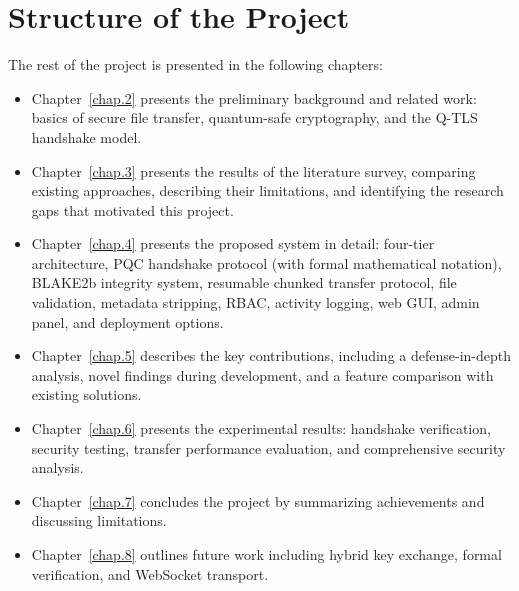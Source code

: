\section{Structure of the Project}

The rest of the project is presented in the following chapters:

\begin{itemize}
    \item Chapter~\ref{chap.2} presents the preliminary background and related work: basics of secure file transfer, quantum-safe cryptography, and the Q-TLS handshake model.
    
    \item Chapter~\ref{chap.3} presents the results of the literature survey, comparing existing approaches, describing their limitations, and identifying the research gaps that motivated this project.
    
    \item Chapter~\ref{chap.4} presents the proposed system in detail: four-tier architecture, PQC handshake protocol (with formal mathematical notation), BLAKE2b integrity system, resumable chunked transfer protocol, file validation, metadata stripping, RBAC, activity logging, web GUI, admin panel, and deployment options.
    
    \item Chapter~\ref{chap.5} describes the key contributions, including a defense-in-depth analysis, novel findings during development, and a feature comparison with existing solutions.
    
    \item Chapter~\ref{chap.6} presents the experimental results: handshake verification, security testing, transfer performance evaluation, and comprehensive security analysis.
    
    \item Chapter~\ref{chap.7} concludes the project by summarizing achievements and discussing limitations.
    
    \item Chapter~\ref{chap.8} outlines future work including hybrid key exchange, formal verification, and WebSocket transport.
\end{itemize}
